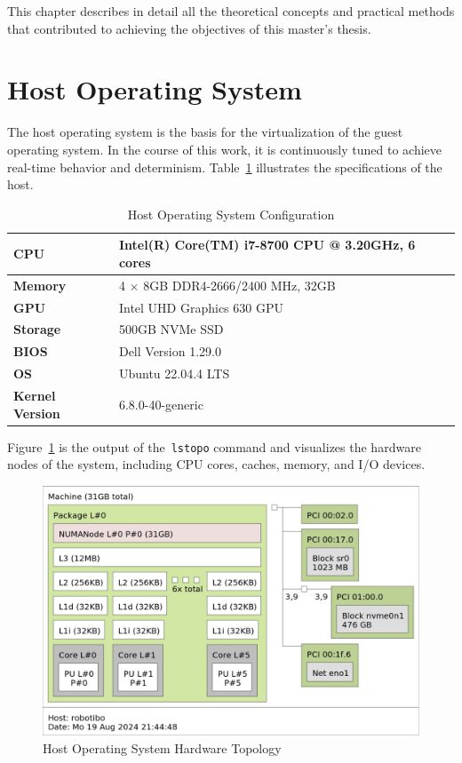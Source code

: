 \documentclass[MMR,Master,english]{style/twbook}
\begin{document}
This chapter describes in detail all the theoretical concepts and practical methods that contributed to achieving the objectives of this master's thesis.

\section{Host Operating System}\label{sec:host_operating_system}
The host operating system is the basis for the virtualization of the guest operating system. In the course of this work, it is continuously tuned to achieve real-time behavior and determinism. Table~\ref{tab:testbed_configuration} illustrates the specifications of the host.

\begin{table}[H]
	\centering
	\caption[Host Operating System Configuration]{Host Operating System Configuration}
	\label{tab:testbed_configuration}
	\setlength{\tabcolsep}{0.5em} %
	{\renewcommand{\arraystretch}{1.2}%
		\begin{tabular}{|l|l|}
			\hline
			\textbf{CPU}            & Intel(R) Core(TM) i7-8700 CPU @ 3.20GHz, 6 cores \\ \hline
			\textbf{Memory}         & 4 $\times$ 8GB DDR4-2666/2400 MHz, 32GB          \\ \hline
			\textbf{GPU}            & Intel UHD Graphics 630 GPU                       \\ \hline
			\textbf{Storage}        & 500GB NVMe SSD                                   \\ \hline
			\textbf{BIOS}           & Dell Version 1.29.0                              \\ \hline
			\textbf{OS}             & Ubuntu 22.04.4 LTS                               \\ \hline
			\textbf{Kernel Version} & 6.8.0-40-generic                                 \\ \hline
		\end{tabular}}
\end{table}

\noindent Figure~\ref{fig:lstopo} is the output of the~\texttt{lstopo} command and visualizes the hardware nodes of the system, including CPU cores, caches, memory, and I/O devices.
\begin{figure}[H]
	\centering
	\includegraphics[width=0.55\columnwidth]{img/methodology/lstopo.png}
	\caption[Host Operating System Hardware Topology]{Host Operating System Hardware Topology}
	\label{fig:lstopo}
\end{figure}
\end{document}

